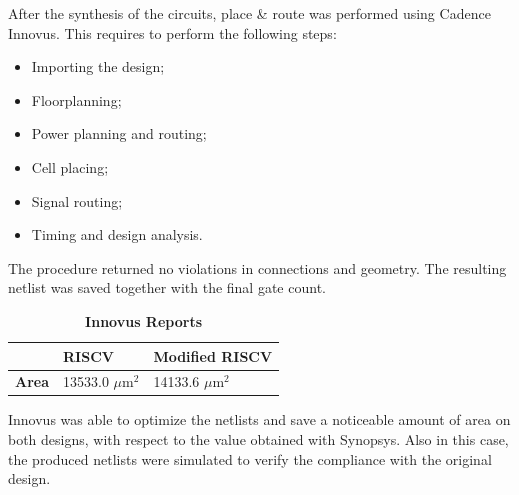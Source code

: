 After the synthesis of the circuits, place \& route was performed using Cadence Innovus. This requires to perform the following steps:

\begin{itemize}
    \item Importing the design;
    \item Floorplanning;
    \item Power planning and routing;
    \item Cell placing;
    \item Signal routing;
    \item Timing and design analysis.
\end{itemize}

The procedure returned no violations in connections and geometry. The resulting netlist was saved together with the final gate count.

\begin{table}[h!]
    \centering
    \begin{tabular}{m{3cm} m{3cm} m{3cm}}
    \hline
         & \textbf{RISCV} & \textbf{Modified RISCV}\\
         \hline
         \textbf{Area} & 13533.0 $\mu$m$^{2}$ & 14133.6 $\mu$m$^{2}$ \\
         \hline
    \end{tabular}
    \caption{\textbf{Innovus Reports}}
    \label{tab:performance}
\end{table}

Innovus was able to optimize the netlists and save a noticeable amount of area on both designs, with respect to the value obtained with Synopsys.
Also in this case, the produced netlists were simulated to verify the compliance with the original design.

